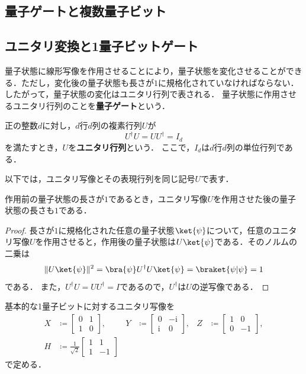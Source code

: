 \begin{samepage}
\section{量子ゲートと複数量子ビット}
\label{sec:gates-composite}

\subsection{ユニタリ変換と1量子ビットゲート}

量子状態に線形写像を作用させることにより，量子状態を変化させることができる．ただし，変化後の量子状態も長さが$1$に規格化されていなければならない．したがって，量子状態の変化はユニタリ行列で表される．
量子状態に作用させるユニタリ行列のことを\textbf{量子ゲート}という．

\begin{defi}[ユニタリ行列]
正の整数$d$に対し，$d$行$d$列の複素行列$U$が
\label{def:unitary-matrix-map}
\begin{equation*}
  U^\dagger U=UU^\dagger=I_d
\end{equation*}
を満たすとき，$U$を\textbf{ユニタリ行列}という\cite{shimada2020}．
ここで，$I_d$は$d$行$d$列の単位行列である．
\end{defi}
\end{samepage}

以下では，ユニタリ写像とその表現行列を同じ記号$U$で表す．

\begin{prop}
  作用前の量子状態の長さが$1$であるとき，ユニタリ写像$U$を作用させた後の量子状態の長さも$1$である．
\end{prop}
\begin{proof}
  長さが$1$に規格化された任意の量子状態$\ket{\psi}$について，任意のユニタリ写像$U$を作用させると，作用後の量子状態は$U\ket{\psi}$である．そのノルムの二乗は
  \[
    \lVert U\ket{\psi}\rVert^2
    =\bra{\psi}U^\dagger U\ket{\psi}
    =\braket{\psi|\psi} = 1
  \]
  である．
  また，$U^\dagger U=UU^\dagger=I$であるので，$U^\dagger$は$U$の逆写像である．
\end{proof}

\begin{defi}
  基本的な1量子ビットに対するユニタリ写像を
  \begin{align*}
    X & \coloneq\begin{bmatrix}0&1\\1&0\end{bmatrix},                    &
    Y & \coloneq\begin{bmatrix}0&-\mathrm{i}\\\mathrm{i}&0\end{bmatrix}, &
    Z & \coloneq\begin{bmatrix}1&0\\0&-1\end{bmatrix},                     \\
    H & \coloneq\frac1{\sqrt2}\begin{bmatrix}1&1\\1&-1\end{bmatrix}
  \end{align*}
  で定める．
\end{defi}


